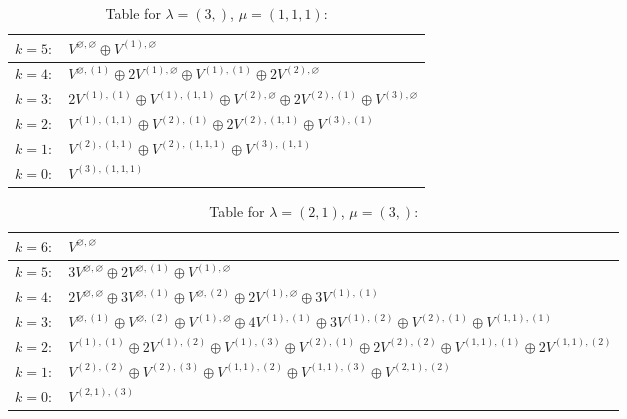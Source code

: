 \renewcommand{\arraystretch}{1.6} 
\begin{table}[H]
\centering
\caption{Table for $\lambda = (3,)$, $\mu = (1, 1, 1)$:}
\begin{tabular}{|>{\centering\arraybackslash}p{15cm}|}
\hline
 $k = 5: \quad V^{\varnothing, \varnothing} \oplus V^{(1), \varnothing} $ \\ \hline
 $k = 4: \quad V^{\varnothing, (1)} \oplus 2 V^{(1), \varnothing} \oplus V^{(1), (1)} \oplus 2 V^{(2), \varnothing} $ \\ \hline
 $k = 3: \quad 2 V^{(1), (1)} \oplus V^{(1), (1, 1)} \oplus V^{(2), \varnothing} \oplus 2 V^{(2), (1)} \oplus V^{(3), \varnothing} $ \\ \hline
 $k = 2: \quad V^{(1), (1, 1)} \oplus V^{(2), (1)} \oplus 2 V^{(2), (1, 1)} \oplus V^{(3), (1)} $ \\ \hline
 $k = 1: \quad V^{(2), (1, 1)} \oplus V^{(2), (1, 1, 1)} \oplus V^{(3), (1, 1)} $ \\ \hline
 $k = 0: \quad V^{(3), (1, 1, 1)} $ \\ \hline
\end{tabular}
\end{table}

\renewcommand{\arraystretch}{1.6} 
\begin{table}[H]
\centering
\caption{Table for $\lambda = (2, 1)$, $\mu = (3,)$:}
\begin{tabular}{|>{\centering\arraybackslash}p{15cm}|}
\hline
 $k = 6: \quad V^{\varnothing, \varnothing} $ \\ \hline
 $k = 5: \quad 3 V^{\varnothing, \varnothing} \oplus 2 V^{\varnothing, (1)} \oplus V^{(1), \varnothing} $ \\ \hline
 $k = 4: \quad 2 V^{\varnothing, \varnothing} \oplus 3 V^{\varnothing, (1)} \oplus V^{\varnothing, (2)} \oplus 2 V^{(1), \varnothing} \oplus 3 V^{(1), (1)} $ \\ \hline
 $k = 3: \quad V^{\varnothing, (1)} \oplus V^{\varnothing, (2)} \oplus V^{(1), \varnothing} \oplus 4 V^{(1), (1)} \oplus 3 V^{(1), (2)} \oplus V^{(2), (1)} \oplus V^{(1, 1), (1)} $ \\ \hline
 $k = 2: \quad V^{(1), (1)} \oplus 2 V^{(1), (2)} \oplus V^{(1), (3)} \oplus V^{(2), (1)} \oplus 2 V^{(2), (2)} \oplus V^{(1, 1), (1)} \oplus 2 V^{(1, 1), (2)} $ \\ \hline
 $k = 1: \quad V^{(2), (2)} \oplus V^{(2), (3)} \oplus V^{(1, 1), (2)} \oplus V^{(1, 1), (3)} \oplus V^{(2, 1), (2)} $ \\ \hline
 $k = 0: \quad V^{(2, 1), (3)} $ \\ \hline
\end{tabular}
\end{table}

